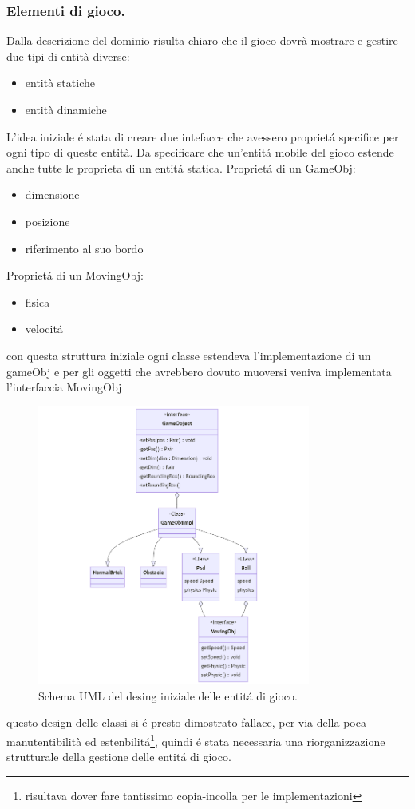 \documentclass[a4paper,12pt]{report}
\begin{document}
\subsubsection{Elementi di gioco.}
Dalla descrizione del dominio risulta chiaro che il gioco dovrà mostrare e gestire due tipi di entità diverse:
\begin{itemize}
    \item entità statiche
    \item entità dinamiche
\end{itemize}
L'idea iniziale é stata di creare due intefacce che avessero proprietá specifice per ogni tipo di queste entità.
Da specificare che un'entitá mobile del gioco estende anche tutte le proprieta di un entitá statica.
Proprietá di un GameObj:
\begin{itemize}
    \item dimensione
    \item posizione
    \item riferimento al suo bordo
\end{itemize}
Proprietá di un MovingObj:
\begin{itemize}
    \item fisica
    \item velocitá
\end{itemize}
con questa struttura iniziale ogni classe estendeva l'implementazione di un gameObj e per gli oggetti che avrebbero dovuto muoversi
veniva implementata l'interfaccia MovingObj
\begin{figure}[H]
    \centering
    \includegraphics[width=0.8\textwidth]{images/EmbrionalGameObjsDesing.png}
    \caption{Schema UML del desing iniziale delle entitá di gioco.}
\end{figure}
questo design delle classi si é presto dimostrato fallace, per via della poca manutentibilità ed estenbilitá\footnote{risultava dover fare tantissimo copia-incolla per le implementazioni},
quindi é stata necessaria una riorganizzazione strutturale della gestione delle entitá di gioco.
\end{document}
